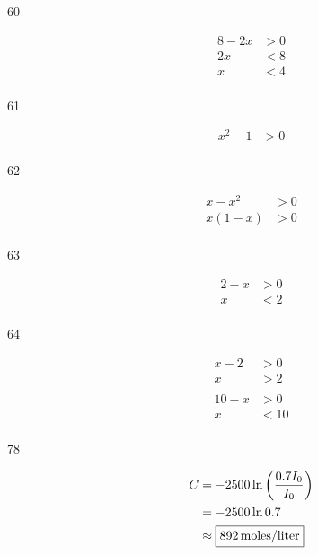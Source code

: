 \documentclass{exam}
\begin{document}
\begin{description}

    \item[60]
      \begin{align*}
        8 - 2x & > 0 \\
        2x     & < 8 \\
        x      & < 4 \\
      \end{align*}


    \pagebreak

    \item[61]
      \begin{align*}
        x^2 - 1 & > 0 \\
      \end{align*}


    \item[62]
      \begin{align*}
        x - x^2  & > 0 \\
        x(1 - x) & > 0 \\
      \end{align*}


    \item[63]
      \begin{align*}
        2 - x & > 0 \\
        x     & < 2 \\
      \end{align*}


    \item[64]
      \begin{align*}
        x-2 & >0 \\
        x   & >2 \\
        \\
        10 - x & > 0 \\
        x      & < 10 \\
      \end{align*}


    \item[78]
      \begin{align*}
        C &= -2500 \ln \left( \frac{0.7 I_0}{I_0} \right) \\
          &= -2500 \ln 0.7 \\
          &\approx \boxed{\unit[892]{moles/liter}} \\
      \end{align*}


\end{description}
\end{document}
